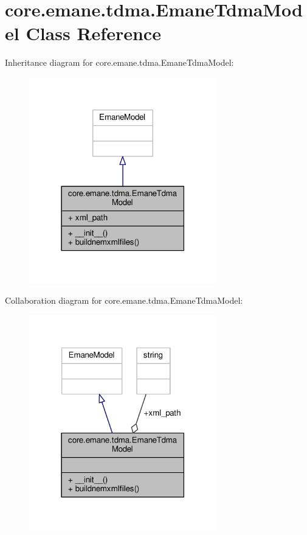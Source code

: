\hypertarget{classcore_1_1emane_1_1tdma_1_1_emane_tdma_model}{\section{core.\+emane.\+tdma.\+Emane\+Tdma\+Model Class Reference}
\label{classcore_1_1emane_1_1tdma_1_1_emane_tdma_model}
}


Inheritance diagram for core.\+emane.\+tdma.\+Emane\+Tdma\+Model\+:
\nopagebreak
\begin{figure}[H]
\begin{center}
\leavevmode
\includegraphics[width=231pt]{classcore_1_1emane_1_1tdma_1_1_emane_tdma_model__inherit__graph}
\end{center}
\end{figure}


Collaboration diagram for core.\+emane.\+tdma.\+Emane\+Tdma\+Model\+:
\nopagebreak
\begin{figure}[H]
\begin{center}
\leavevmode
\includegraphics[width=231pt]{classcore_1_1emane_1_1tdma_1_1_emane_tdma_model__coll__graph}
\end{center}
\end{figure}
